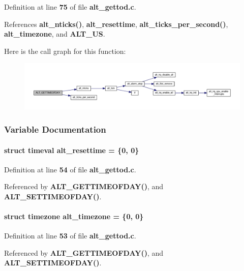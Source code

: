 Definition at line {\bf 75} of file {\bf alt\+\_\+gettod.\+c}.



References {\bf alt\+\_\+nticks()}, {\bf alt\+\_\+resettime}, {\bf alt\+\_\+ticks\+\_\+per\+\_\+second()}, {\bf alt\+\_\+timezone}, and {\bf A\+L\+T\+\_\+\+US}.



Here is the call graph for this function\+:
\nopagebreak
\begin{figure}[H]
\begin{center}
\leavevmode
\includegraphics[width=350pt]{d0/dc8/alt__gettod_8c_a876baa5f7786c52648faf9313b2872c2_cgraph}
\end{center}
\end{figure}




\subsubsection{Variable Documentation}
\paragraph[{alt\+\_\+resettime}]{\setlength{\rightskip}{0pt plus 5cm}struct timeval alt\+\_\+resettime = \{0, 0\}}\label{alt__gettod_8c_a871bb39e3efcef7ed5960c633edc06af}


Definition at line {\bf 54} of file {\bf alt\+\_\+gettod.\+c}.



Referenced by {\bf A\+L\+T\+\_\+\+G\+E\+T\+T\+I\+M\+E\+O\+F\+D\+A\+Y()}, and {\bf A\+L\+T\+\_\+\+S\+E\+T\+T\+I\+M\+E\+O\+F\+D\+A\+Y()}.

\paragraph[{alt\+\_\+timezone}]{\setlength{\rightskip}{0pt plus 5cm}struct timezone alt\+\_\+timezone = \{0, 0\}}\label{alt__gettod_8c_a4a36ab50424b296f44e353306e335151}


Definition at line {\bf 53} of file {\bf alt\+\_\+gettod.\+c}.



Referenced by {\bf A\+L\+T\+\_\+\+G\+E\+T\+T\+I\+M\+E\+O\+F\+D\+A\+Y()}, and {\bf A\+L\+T\+\_\+\+S\+E\+T\+T\+I\+M\+E\+O\+F\+D\+A\+Y()}.

